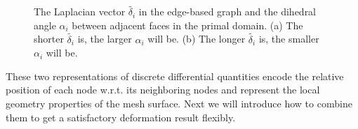 \begin{figure} [htbp]
  \caption{The Laplacian vector $\tilde{\delta_i}$ in the edge-based graph and the dihedral angle $\alpha_i$ between adjacent faces in the primal domain. (a) The shorter $\tilde{\delta_i}$ is, the larger $\alpha_i$ will be. (b) The longer $\tilde{\delta_i}$ is, the smaller $\alpha_i$ will be. }
  \label{fig:edgebaseddihedral} %
\end{figure}

These two representations  of discrete differential quantities
encode the relative position of each node w.r.t. its neighboring
nodes and represent the local geometry properties of the mesh
surface. Next we will introduce how to combine them to get a
satisfactory deformation result flexibly.

